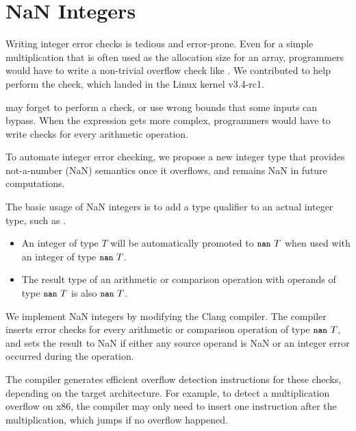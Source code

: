 \section{NaN Integers}
\label{s:miti}


Writing integer error checks is tedious and error-prone.
Even for a simple multiplication  that is often used
as the allocation size for an array, programmers would
have to write a non-trivial overflow check like .  We contributed 
to help perform the check, which landed in the Linux kernel v3.4-rc1.

may forget to perform a check, or use wrong bounds that some inputs
can bypass. 
When the expression gets more complex,
programmers would have to write checks for every arithmetic operation.

To automate integer error checking, we propose a new integer type that provides
not-a-number (NaN) semantics once it overflows, and remains NaN in future
computations.

The basic usage of NaN integers is to add a type qualifier 
to an actual integer type, such as .
\begin{itemize}
\item
An integer of type $T$ will be automatically promoted to $\cc{nan}\ T$
when used with an integer of type $\cc{nan}\ T$.
\item
The result type of an arithmetic or comparison operation with
operands of type $\cc{nan}\ T$ is also $\cc{nan}\ T$.
\end{itemize}
We implement NaN integers by modifying the Clang compiler.
The compiler inserts error checks for every arithmetic or
comparison operation of type $\cc{nan}\ T$, and sets the result to
NaN if either any source operand is NaN or an integer error occurred
during the operation.

The compiler generates efficient overflow detection instructions
for these checks, depending on the target architecture.  For example,
to detect a multiplication overflow on x86, the compiler may only
need to insert one  instruction after the multiplication,
which jumps if no overflow happened.

